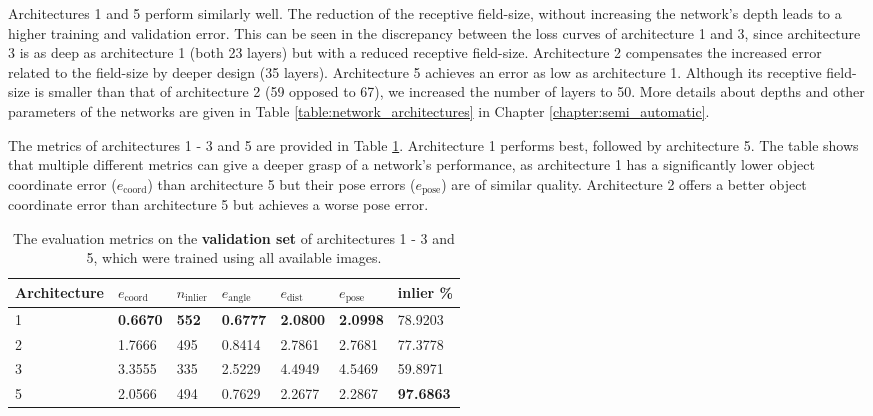 Architectures 1 and 5 perform similarly well. The reduction of the receptive field-size, without increasing the network's depth leads to a higher training and validation error. This can be seen in the discrepancy between the loss curves of architecture 1 and 3, since architecture 3 is as deep as architecture 1 (both 23 layers) but with a reduced receptive field-size. Architecture 2 compensates the increased error related to the field-size by deeper design (35 layers). Architecture 5 achieves an error as low as architecture 1. Although its receptive field-size is smaller than that of architecture 2 (59 opposed to 67), we increased the number of layers to 50. More details about depths and other parameters of the networks are given in Table \ref{table:network_architectures} in Chapter \ref{chapter:semi_automatic}.

The metrics of architectures 1 - 3 and 5 are provided in Table \ref{table:architecture_validation_metrics_comparison}. Architecture 1 performs best, followed by architecture 5. The table shows that multiple different metrics can give a deeper grasp of a network's performance, as architecture 1 has a significantly lower object coordinate error ($e_{\text{coord}}$) than architecture 5 but their pose errors ($e_{\text{pose}}$) are of similar quality. Architecture 2 offers a better object coordinate error than architecture 5 but achieves a worse pose error.

\begin{table}[]
\centering
\begin{tabular}{|l||llllll|} \hline
Architecture & $e_{\text{coord}}$ & $n_{\text{inlier}}$ & $e_{\text{angle}}$ & $e_{\text{dist}}$ & $e_{\text{pose}}$ & inlier \% \\ \hline \hline \rowcolor{Gray}
1            & \textbf{0.6670}             & \textbf{552}                 & \textbf{0.6777}             & \textbf{2.0800}           & \textbf{2.0998} & 78.9203  \\ \hline
2            & 1.7666             & 495                 & 0.8414             & 2.7861            & 2.7681  & 77.3778       \\ \hline \rowcolor{Gray}
3            & 3.3555             & 335                 & 2.5229             & 4.4949            & 4.5469    & 59.8971        \\ \hline
5            & 2.0566             & 494                 & 0.7629             & 2.2677            & 2.2867 & \textbf{97.6863} \\ \hline       
\end{tabular}
\caption{The evaluation metrics on the \textbf{validation set} of architectures 1 - 3 and 5, which were trained using all available images.}
\label{table:architecture_validation_metrics_comparison}
\end{table}

